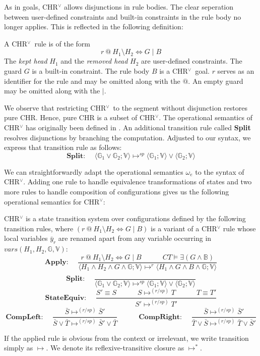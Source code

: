 \documentclass[acmtocl]{acmtrans2m}
\newcommand\state[1]{\langle #1 \rangle}
\newcommand{\B}{\ensuremath{\mathbb{B}}}
\newcommand{\V}{\ensuremath{\mathbb{V}}}
\newcommand{\G}{\ensuremath{\mathbb{G}}}
\newcommand{\bS}{\bar{S}}
\newcommand{\bT}{\bar{T}}
\newcommand{\by}{\bar{y}}
\newcommand{\chrv}{CHR$^\vee$}
\newcommand{\oesq}{\ensuremath{\omega_{e}}}
\begin{document}
As in goals, CHR$^\vee$ allows disjunctions in rule bodies. The clear
seperation between user-defined constraints and built-in constraints in the
rule body no longer applies. This is reflected in the following definition:

\begin{definition}[\chrv\ Rules]
	\label{def:chrv-rule}
A \chrv\ rule is of the form
\[
	r\ @\ H_1\setminus H_2\Leftrightarrow G \mid B
\]
The \emph{kept head} $H_1$ and the \emph{removed head} $H_2$ are
user-defined constraints. The guard $G$ is a built-in
constraint. The rule body $B$ is a \chrv\ goal. $r$ serves as an identifier for
the rule and may be omitted along with the $@$. An empty guard may be omitted
along with the $\mid$.
\end{definition}

We observe that restricting \chrv\ to the segment without disjunction restores
pure CHR. Hence, pure CHR is a subset of \chrv. The operational semantics of
CHR$^\vee$ has originally been defined in \cite{DBLP:conf/fqas/AbdennadherS98}.
An additional transition rule called \textbf{Split} resolves disjunctions by
branching the computation. Adjusted to our syntax, we express that transition rule as
follows:
\[
	\textbf{Split: }\quad
	\state{ \G_1\vee \G_2 ; \V}
		\mapsto^{sp}
	\state{ \G_1 ; \V}
		\vee
	\state{ \G_2 ; \V}
\]

We can straightforwardly adapt the operational semantics $\oesq$ to the syntax of
CHR$^\vee$. Adding one rule to handle equivalence transformations of states and
two more rules to handle composition of configurations gives us the following
operational semantics for CHR$^\vee$:

\begin{definition}
CHR$^\vee$ is a state transition system over configurations
defined by the following transition rules, where $(r\ @\ H_1 \setminus H_2
\Leftrightarrow G\mid B)$ is a variant of a CHR$^\vee$ rule whose local
variables $\by_r$ are renamed apart from any variable occurring in $vars(H_1, H_2,\G,\V)$:
\[
	\textbf{Apply: }\quad
	\frac{r\ @\ H_1 \setminus H_2 \Leftrightarrow G\mid B
		\quad\quad\quad
	CT\models \exists(G\wedge\B)}
{
	\state{H_1 \wedge H_2 \wedge G\wedge\G;\V}
		\mapsto^r
	\state{H_1 \wedge G\wedge B\wedge\G;\V}
}
\]
\[
	\textbf{Split: }\quad
	\frac{
		\phantom{\top}
	}
	{
		\state{ \G_1\vee \G_2 ; \V}
			\mapsto^{sp}
		\state{ \G_1 ; \V}
			\vee
		\state{ \G_2 ; \V}
	}
\]
\[
	\textbf{StateEquiv: }\quad
	\frac{
		S'\equiv S
			\quad\quad\quad
		S\mapsto^{(r/sp)} T
			\quad\quad\quad
		T\equiv T'
	}
	{
		S'
			\mapsto^{(r/sp)}
		T'
	}
\]
\[
	\textbf{CompLeft: }\quad
	\frac{
		\bS\mapsto^{(r/sp)} \bS'
	}{
		\bS\vee\bT\mapsto^{(r/sp)} \bS'\vee\bT
	}
	\quad\quad\quad
	\textbf{CompRight: }\quad
	\frac{
		\bS\mapsto^{(r/sp)} \bS'
	}{
		\bT\vee\bS\mapsto^{(r/sp)} \bT\vee\bS'
	}
\]\vspace{1mm}

If the applied rule is obvious from the context or irrelevant, we write
transition simply as $\mapsto$. We denote its reflexive-transitive closure
as $\mapsto^{*}$.
\end{definition}
\end{document}
